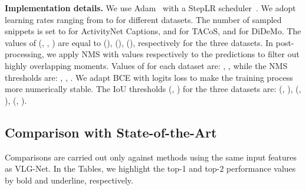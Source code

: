\documentclass[10pt,twocolumn,letterpaper]{article}
\begin{document}
\begin{table}[!t]
    \centering {}
\vspace{.1cm}
\caption{\label{tab:datasets}{\bf Datasets statistics.} We report relevant information for each datasets available for the grounding task. }
     \vspace{-0.5cm}
\end{table}

\noindent\textbf{Implementation details.}
We use Adam~\cite{kingma2014adam} with a StepLR scheduler~\cite{loshchilov2016sgdr}. 
We adopt learning rates ranging from  to  for different datasets. The number of sampled snippets  is set to  for ActivityNet Captions, and  for TACoS, and  for DiDeMo. The values of (, , ) are equal to (), (), (), respectively for the three datasets. In post-processing, we apply NMS with values respectively to the  predictions to filter out highly overlapping moments. Values of  for each dataset are: , ,  while the NMS thresholds are: , , . We adapt BCE with logits loss to make the training process more numerically stable. The IoU thresholds (, ) for the three datasets are: (, ), (, ), (, ).



\subsection{Comparison with State-of-the-Art}
Comparisons are carried out only against methods using the same input features as VLG-Net. In the Tables, we highlight the top-1 and top-2 performance values by bold and underline, respectively. 
\end{document}
